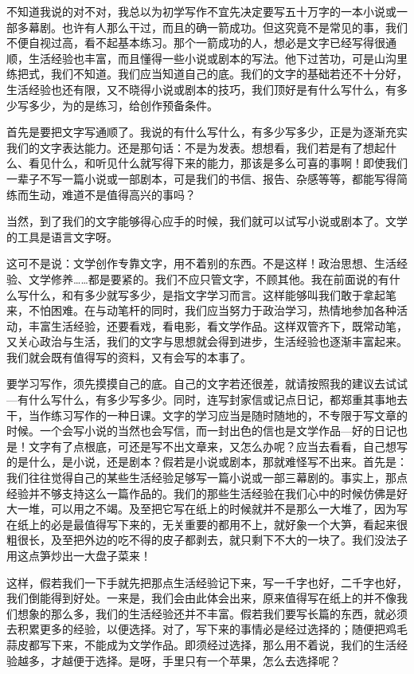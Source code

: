 \documentclass[fontset=fandol,12pt,a5paper]{ctexbook}
\begin{document}
不知道我说的对不对，我总以为初学写作不宜先决定要写五十万字的一本小说或一部多幕剧。也许有人那么干过，而且的确一箭成功。但这究竟不是常见的事，我们不便自视过高，看不起基本练习。那个一箭成功的人，想必是文字已经写得很通顺，生活经验也丰富，而且懂得一些小说或剧本的写法。他下过苦功，可是山沟里练把式，我们不知道。我们应当知道自己的底。我们的文字的基础若还不十分好，生活经验也还有限，又不晓得小说或剧本的技巧，我们顶好是有什么写什么，有多少写多少，为的是练习，给创作预备条件。

首先是要把文字写通顺了。我说的有什么写什么，有多少写多少，正是为逐渐充实我们的文字表达能力。还是那句话：不是为发表。想想看，我们若是有了想起什么、看见什么，和听见什么就写得下来的能力，那该是多么可喜的事啊！即使我们一辈子不写一篇小说或一部剧本，可是我们的书信、报告、杂感等等，都能写得简练而生动，难道不是值得高兴的事吗？

当然，到了我们的文字能够得心应手的时候，我们就可以试写小说或剧本了。文学的工具是语言文字呀。

这可不是说：文学创作专靠文字，用不着别的东西。不是这样！政治思想、生活经验、文学修养……都是要紧的。我们不应只管文字，不顾其他。我在前面说的有什么写什么，和有多少就写多少，是指文字学习而言。这样能够叫我们敢于拿起笔来，不怕困难。在与动笔杆的同时，我们应当努力于政治学习，热情地参加各种活动，丰富生活经验，还要看戏，看电影，看文学作品。这样双管齐下，既常动笔，又关心政治与生活，我们的文字与思想就会得到进步，生活经验也逐渐丰富起来。我们就会既有值得写的资料，又有会写的本事了。

要学习写作，须先摸摸自己的底。自己的文字若还很差，就请按照我的建议去试试—有什么写什么，有多少写多少。同时，连写封家信或记点日记，都郑重其事地去干，当作练习写作的一种日课。文字的学习应当是随时随地的，不专限于写文章的时候。一个会写小说的当然也会写信，而一封出色的信也是文学作品—好的日记也是！文字有了点根底，可还是写不出文章来，又怎么办呢？应当去看看，自己想写的是什么，是小说，还是剧本？假若是小说或剧本，那就难怪写不出来。首先是：我们往往觉得自己的某些生活经验足够写一篇小说或一部三幕剧的。事实上，那点经验并不够支持这么一篇作品的。我们的那些生活经验在我们心中的时候仿佛是好大一堆，可以用之不竭。及至把它写在纸上的时候就并不是那么一大堆了，因为写在纸上的必是最值得写下来的，无关重要的都用不上，就好象一个大笋，看起来很粗很长，及至把外边的吃不得的皮子都剥去，就只剩下不大的一块了。我们没法子用这点笋炒出一大盘子菜来！

这样，假若我们一下手就先把那点生活经验记下来，写一千字也好，二千字也好，我们倒能得到好处。一来是，我们会由此体会出来，原来值得写在纸上的并不像我们想象的那么多，我们的生活经验还并不丰富。假若我们要写长篇的东西，就必须去积累更多的经验，以便选择。对了，写下来的事情必是经过选择的；随便把鸡毛蒜皮都写下来，不能成为文学作品。即须经过选择，那么用不着说，我们的生活经验越多，才越便于选择。是呀，手里只有一个苹果，怎么去选择呢？
\end{document}
